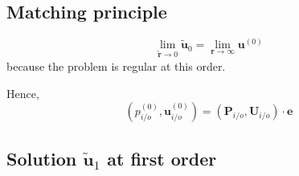 \subsection{Matching principle}
\begin{equation}
    \lim_{\widetilde{\textbf{r}}\to 0} \widetilde{\textbf{u}}_0
    = \lim_{\textbf{r}\to \infty} \textbf{u}^{(0)}
\end{equation}
because the problem is regular at this order.

Hence,
\begin{equation}
    (p^{(0)}_{i/o}, \textbf{u}^{(0)}_{i/o}) = (\textbf{P}_{i/o}, \textbf{U}_{i/o}) \cdot \textbf{e}
\end{equation}

\subsection{Solution $\widetilde{\textbf{u}}_1$ at first order}

